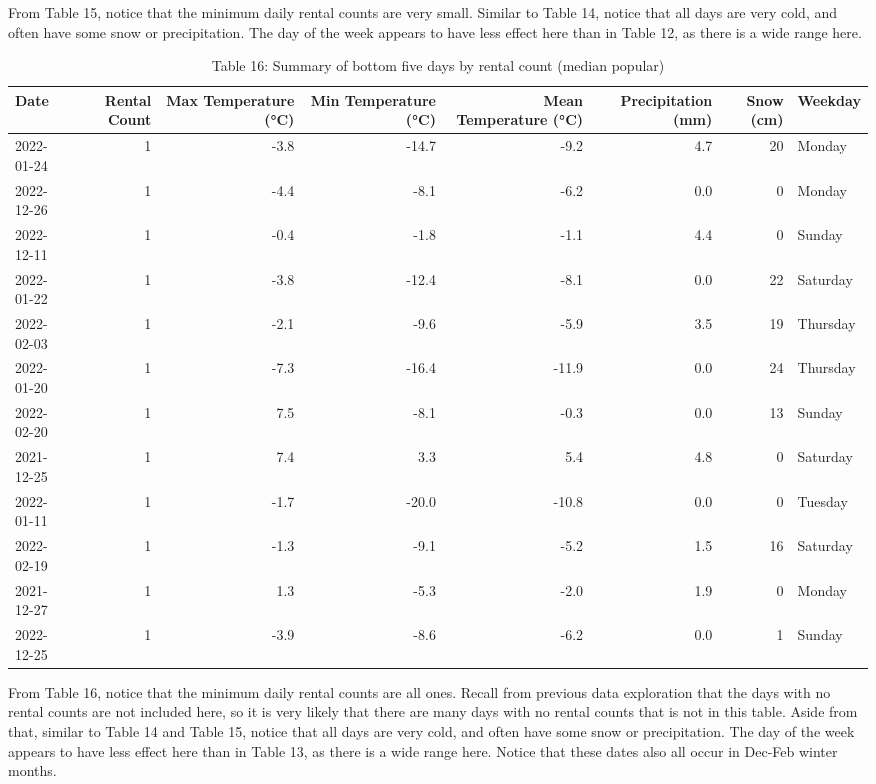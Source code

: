 \documentclass[
]{article}
\begin{document}
From Table 15, notice that the minimum daily rental counts are very
small. Similar to Table 14, notice that all days are very cold, and
often have some snow or precipitation. The day of the week appears to
have less effect here than in Table 12, as there is a wide range here.

\begin{table}[!h]

\caption{\label{tab:Table 16 conditions for minimum bike share riders (median popularity)}Table 16: Summary of bottom five days by rental count (median popular)}
\centering
\begin{tabular}[t]{l|r|r|r|r|r|r|l}
\hline
Date & Rental Count & Max Temperature (°C) & Min Temperature (°C) & Mean Temperature (°C) & Precipitation (mm) & Snow (cm) & Weekday\\
\hline
2022-01-24 & 1 & -3.8 & -14.7 & -9.2 & 4.7 & 20 & Monday\\
\hline
2022-12-26 & 1 & -4.4 & -8.1 & -6.2 & 0.0 & 0 & Monday\\
\hline
2022-12-11 & 1 & -0.4 & -1.8 & -1.1 & 4.4 & 0 & Sunday\\
\hline
2022-01-22 & 1 & -3.8 & -12.4 & -8.1 & 0.0 & 22 & Saturday\\
\hline
2022-02-03 & 1 & -2.1 & -9.6 & -5.9 & 3.5 & 19 & Thursday\\
\hline
2022-01-20 & 1 & -7.3 & -16.4 & -11.9 & 0.0 & 24 & Thursday\\
\hline
2022-02-20 & 1 & 7.5 & -8.1 & -0.3 & 0.0 & 13 & Sunday\\
\hline
2021-12-25 & 1 & 7.4 & 3.3 & 5.4 & 4.8 & 0 & Saturday\\
\hline
2022-01-11 & 1 & -1.7 & -20.0 & -10.8 & 0.0 & 0 & Tuesday\\
\hline
2022-02-19 & 1 & -1.3 & -9.1 & -5.2 & 1.5 & 16 & Saturday\\
\hline
2021-12-27 & 1 & 1.3 & -5.3 & -2.0 & 1.9 & 0 & Monday\\
\hline
2022-12-25 & 1 & -3.9 & -8.6 & -6.2 & 0.0 & 1 & Sunday\\
\hline
\end{tabular}
\end{table}

From Table 16, notice that the minimum daily rental counts are all ones.
Recall from previous data exploration that the days with no rental
counts are not included here, so it is very likely that there are many
days with no rental counts that is not in this table. Aside from that,
similar to Table 14 and Table 15, notice that all days are very cold,
and often have some snow or precipitation. The day of the week appears
to have less effect here than in Table 13, as there is a wide range
here. Notice that these dates also all occur in Dec-Feb winter months.
\end{document}
